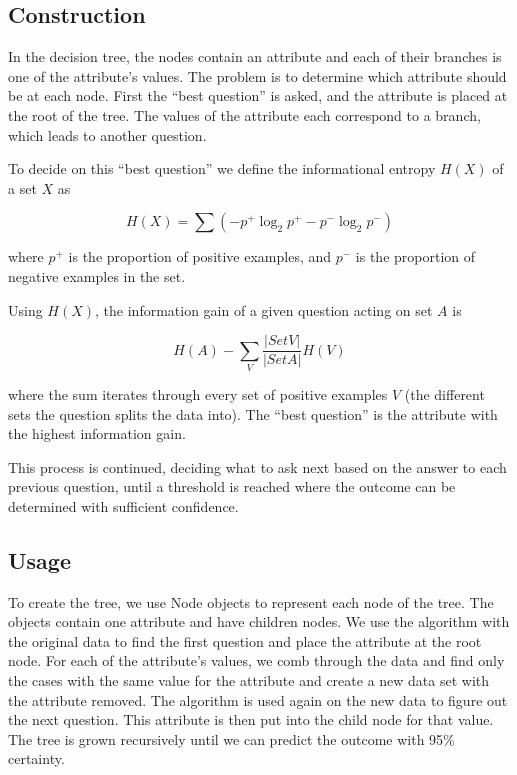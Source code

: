 \documentclass[11pt,a4paper]{article}
\begin{document}
\subsection{Construction}
\label{DecisionTrees:Construction}

In the decision tree, the nodes contain an attribute and each of their branches is one of the attribute's values. The problem is to determine which attribute should be at each node. First the ``best question'' is asked, and the attribute is placed at the root of the tree. The values of the attribute each correspond to a branch, which leads to another question.

To decide on this ``best question'' we define the informational entropy $H(X)$ of a set $X$ as 

\[
H(X) = \sum{(-p^+ \log_2{p^+} - p^- \log_2{p^-})}
\]

where $p^+$ is the proportion of positive examples, and $p^-$ is the proportion of negative examples in the set.

Using $H(X)$, the information gain of a given question acting on set $A$ is

\[
H(A) - \sum_V{\frac{|Set V|}{|Set A|}H(V)}
\]

where the sum iterates through every set of positive examples $V$ (the different sets the question splits the data into). The ``best question'' is the attribute with the highest information gain.

This process is continued, deciding what to ask next based on the answer to each previous question, until a threshold is reached where the outcome can be determined with sufficient confidence.

\subsection{Usage} 
\label{DecisionTrees:Usage}

To create the tree, we use Node objects to represent each node of the tree. The objects contain one attribute and have children nodes. We use the algorithm with the original data to find the first question and place the attribute at the root node. For each of the attribute's values, we comb through the data and find only the cases with the same value for the attribute and create a new data set with the attribute removed. The algorithm is used again on the new data to figure out the next question. This attribute is then put into the child node for that value. The tree is grown recursively until we can predict the outcome with 95\% certainty.
\end{document}
